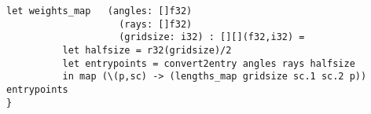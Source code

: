 \begin{lstlisting}[language=Futhark]
     let weights_map   (angles: []f32)
                    (rays: []f32)
                    (gridsize: i32) : [][](f32,i32) =
          let halfsize = r32(gridsize)/2
          let entrypoints = convert2entry angles rays halfsize
          in map (\(p,sc) -> (lengths_map gridsize sc.1 sc.2 p)) entrypoints
}

\end{lstlisting}
